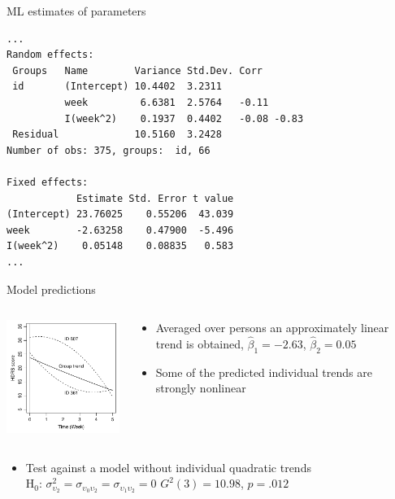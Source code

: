 \documentclass[aspectratio=169]{beamer}
\begin{document}
\begin{frame}[fragile]{ML estimates of parameters}
\begin{lstlisting}
...
Random effects:
 Groups   Name        Variance Std.Dev. Corr       
 id       (Intercept) 10.4402  3.2311              
          week         6.6381  2.5764   -0.11      
          I(week^2)    0.1937  0.4402   -0.08 -0.83
 Residual             10.5160  3.2428              
Number of obs: 375, groups:  id, 66

Fixed effects:
            Estimate Std. Error t value
(Intercept) 23.76025    0.55206  43.039
week        -2.63258    0.47900  -5.496
I(week^2)    0.05148    0.08835   0.583
...
\end{lstlisting}
\end{frame}

\begin{frame}{Model predictions}
\begin{columns}
\begin{column}{6cm}
\includegraphics[width=6cm]{../figures/hdrs-quad}
\end{column}
%
\begin{column}{5cm}
  \begin{itemize}
    \item Averaged over persons an approximately linear trend is obtained,
      $\hat{\beta}_1 = -2.63$, $\hat{\beta}_2 = 0.05$
    \item Some of the predicted individual trends are strongly nonlinear
  \end{itemize}
\end{column}
\end{columns}
  \begin{itemize}
    \item Test against a model without individual quadratic trends\\[2ex]

H$_0$: $\sigma^2_{\upsilon_2} = \sigma_{\upsilon_0 \upsilon_2} =
\sigma_{\upsilon_1 \upsilon_2} = 0$ \qquad
$G^2(3) = 10.98$, $p = .012$
  \end{itemize}
\end{frame}
\end{document}
